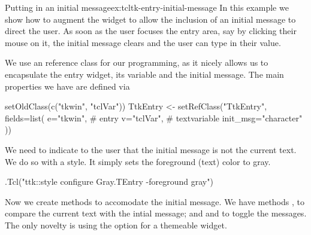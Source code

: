 \begin{example}{Putting in an initial message}{ex:tcltk-entry-initial-message}
In this example we show how to augment the  widget
to allow the inclusion of an initial message to direct the user. As
soon as the user focuses the entry area, say by clicking their mouse
on it, the initial message clears and the user can type in their
value.

We use an \R{} reference class for our programming, as it nicely
allows us to encapsulate the entry widget, its \TCL{} variable and the
initial message. The main properties we have are defined via


\begin{Schunk}
\begin{Sinput}
 setOldClass(c("tkwin", "tclVar"))
 TtkEntry <- setRefClass("TtkEntry",
                         fields=list(
                           e="tkwin",    # entry
                           v="tclVar",   # textvariable
                           init_msg="character"
                           ))
\end{Sinput}
\end{Schunk}
%

We need to indicate to the user that the initial message is not the
current text. We do so with a style. It simply sets the foreground
(text) color to gray.

\begin{Schunk}
\begin{Sinput}
 .Tcl("ttk::style configure Gray.TEntry -foreground gray") 
\end{Sinput}
\end{Schunk}

%
Now we create methods to accomodate the initial message. We have
methods , to compare the current text with the
intial message; and  and 
to toggle the messages. The only novelty is using the
 option for a themeable widget.
\begin{Schunk}
\end{Schunk}


\end{example}
